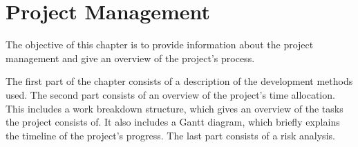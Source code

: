 \chapter{Project Management}

The objective of this chapter is to provide information about the project management and give an overview of the project's process. 

The first part of the chapter consists of a description of the development methods used. The second part consists of an overview of the project's time allocation. This includes a work breakdown structure, which gives an overview of the tasks the project consists of. It also includes a Gantt diagram, which briefly explains the timeline of the project's progress. The last part consists of a risk analysis.




\newpage



